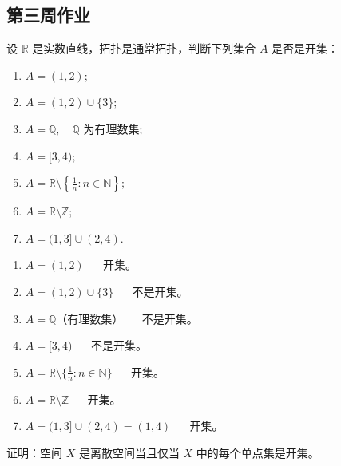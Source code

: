 \subsection{第三周作业}
\begin{exercise}
设 $\mathbb{R}$ 是实数直线，拓扑是通常拓扑，判断下列集合 $A$ 是否是开集：  
\begin{enumerate}
  \item $A = (1,2);$
  \item $A = (1,2) \cup \{3\};$
  \item $A = \mathbb{Q}, \quad \mathbb{Q}$ 为有理数集;
  \item $A = [3,4);$
  \item $A = \mathbb{R}\setminus\left\{\tfrac{1}{n} : n\in\mathbb{N}\right\};$
  \item $A = \mathbb{R}\setminus\mathbb{Z};$
  \item $A = (1,3]\cup(2,4).$
\end{enumerate}
\end{exercise}
\begin{enumerate}
  \item $A=(1,2)$  
  $\quad$ 开集。

  \item $A=(1,2)\cup\{3\}$  
  $\quad$ 不是开集。

  \item $A=\mathbb{Q}$（有理数集）  
  $\quad$ 不是开集。

  \item $A=[3,4)$  
  $\quad$ 不是开集。

  \item $A=\mathbb{R}\setminus\{\tfrac{1}{n}:n\in\mathbb{N}\}$  
  $\quad$ 开集。

  \item $A=\mathbb{R}\setminus\mathbb{Z}$  
  $\quad$ 开集。

  \item $A=(1,3]\cup(2,4)=(1,4)$  
  $\quad$ 开集。
\end{enumerate}
\begin{exercise}
证明：空间 $X$ 是离散空间当且仅当 $X$ 中的每个单点集是开集。
\end{exercise}

